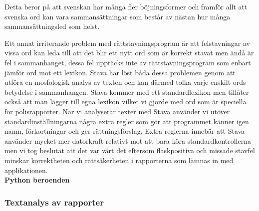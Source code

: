 \documentclass[swedish]{maucsthesis}
\begin{document}
\begin{displayquote}
  Detta beror på att svenskan har många fler böjningsformer och framför allt att
  svenska ord kan vara sammansättningar som består av nästan hur många
  sammansättningsled som helst.
\end{displayquote}

Ett annat irriterande problem med rättstavningsprogram är att felstavningar av
vissa ord kan leda till att det blir ett nytt ord som är korrekt stavat men ändå
är fel i sammanhanget, dessa fel upptäcks inte av rättstavningsprogram som
enbart jämför ord mot ett lexikon. Stava har löst båda dessa problemen genom att
utföra en mosfologisk analys av texten och kan därmed tolka varje enskilt ords
betydelse i sammanhangen. Stava kommer med ett standardlexikon men tillåter
också att man lägger till egna lexikon vilket vi gjorde med ord som är speciella
för polisrapporter. När vi analyserar texter med Stava använder vi utöver
standardinställningarna några extra regler som gör att programmet känner igen
namn, förkortningar och ger rättningsförslag. Extra reglerna innebär att Stava
använder mycket mer datorkraft relativt mot att bara köra standardkontrollerna
men vi tog beslutat att det var värt det eftersom flaskpositiva och missade
stavfel minskar korrektheten och rättsäkerheten i rapporterna som lämnas in med
applikationen.
\\[1PC]
\textbf{Python beroenden}\newline

\subsubsection{Textanalys av rapporter}
\end{document}
